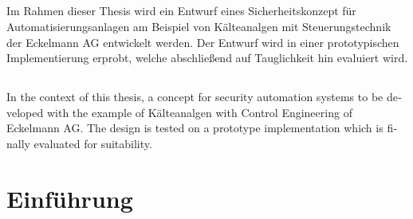 \documentclass[11pt,a4paper]{report}
\begin{document}

\vfill
\section*{\center\abstractname{}}

Im Rahmen dieser Thesis wird ein Entwurf eines Sicherheitskonzept für Automatisierungsanlagen am Beispiel von Kälteanalgen mit Steuerungstechnik der Eckelmann AG entwickelt werden. Der Entwurf wird in einer prototypischen Implementierung erprobt, welche abschließend auf Tauglichkeit hin evaluiert wird.

\vfill

\begin{otherlanguage}{english} 
\section*{\center\abstractname{}}

In the context of this thesis, a concept for security automation systems to be developed with the example of Kälteanalgen with Control Engineering of Eckelmann AG. The design is tested on a prototype implementation which is finally evaluated for suitability.

\end{otherlanguage}
\vfill

\tableofcontents
\clearpage 


\chapter{Einführung} \label{chap:intro}
\end{document}
